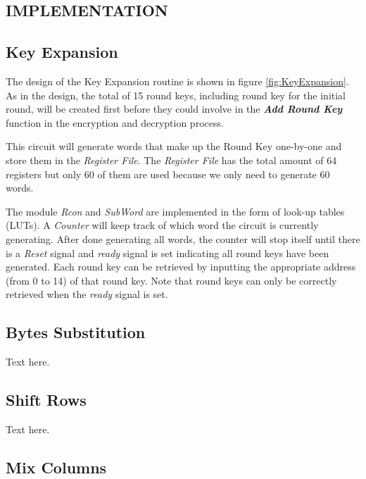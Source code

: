 \documentclass[a4paper, 10pt]{article}
\begin{document}
\begin{multicols}{2}
        \section{IMPLEMENTATION}

            \subsection{Key Expansion}

            The design of the Key Expansion routine is shown in figure \ref{fig:KeyExpansion}. As in the design, the total of 15 round keys, including round key for the initial round, will be created first before they could involve in the \textbf{\textit{Add Round Key}} function in the encryption and decryption process.
            
            This circuit will generate words that make up the Round Key one-by-one and store them in the \textit{Register File}. The \textit{Register File} has the total amount of 64 registers but only 60 of them are used because we only need to generate 60 words.

            The module \textit{Rcon} and \textit{SubWord} are implemented in the form of look-up tables (LUTs). A \textit{Counter} will keep track of which word the circuit is currently generating. After done generating all words, the counter will stop itself until there is a \textit{Reset} signal and \textit{ready} signal is set indicating all round keys have been generated. Each round key can be retrieved by inputting the appropriate address (from 0 to 14) of that round key. Note that round keys can only be correctly retrieved when the \textit{ready} signal is set.

            \subsection{Bytes Substitution}

            Text here.

            \subsection{Shift Rows}

            Text here.

            \subsection{Mix Columns}


\end{multicols}
\end{document}
